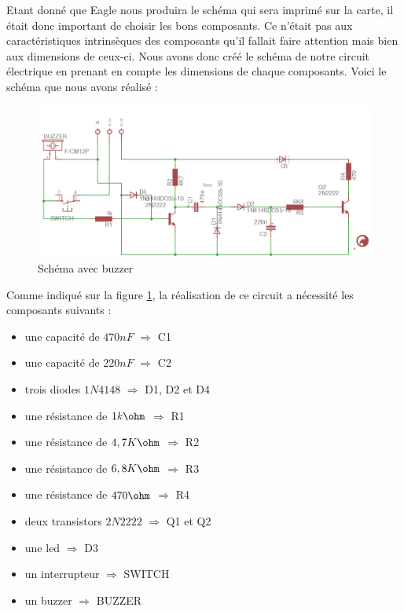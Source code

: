 Etant donné que Eagle nous produira le schéma qui sera imprimé sur la carte, il était donc important de choisir les bons composants. Ce n'était pas aux caractéristiques intrinsèques des composants qu'il fallait faire attention mais bien aux dimensions de ceux-ci. Nous avons donc créé le schéma de notre circuit électrique en prenant en compte les dimensions de chaque composants. Voici le schéma que nous avons réalisé : 


\begin{figure}[H]
\centering
\includegraphics[width=1\textwidth]{ressources/schema_final}
\caption{Schéma avec buzzer}
\label{schemaEagle}
\end{figure}

Comme indiqué sur la figure \ref{schemaEagle}, la réalisation de ce circuit a nécessité les composants suivants :
\begin{itemize}
	\item une capacité de \textbf{$470 nF$} $\Rightarrow$ C1
	\item une capacité de \textbf{$220 nF$}  $\Rightarrow$ C2
	\item trois diodes \textbf{$1N4148$} $\Rightarrow$ D1, D2 et D4
	\item une résistance de \textbf{$ 1k\ohm $} $\Rightarrow$ R1
	\item  une résistance de \textbf{$ 4,7K\ohm $} $\Rightarrow$ R2
	\item  une résistance de \textbf{$ 6,8K\ohm $} $\Rightarrow$ R3
	\item une résistance de \textbf{$470\ohm $} $\Rightarrow$ R4
	\item deux transistors  \textbf{$2N2222 $} $\Rightarrow$ Q1 et Q2
	\item une led $\Rightarrow$ D3
	\item un interrupteur $\Rightarrow$ SWITCH
	\item un buzzer $\Rightarrow$ BUZZER
\end{itemize}



